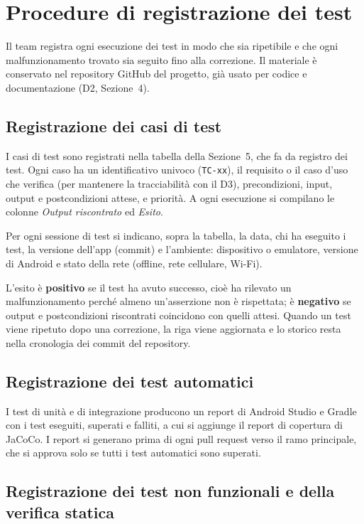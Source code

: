 \section{Procedure di registrazione dei test}

Il team registra ogni esecuzione dei test in modo che sia ripetibile e che ogni malfunzionamento trovato sia seguito fino alla correzione. Il materiale è conservato nel repository GitHub del progetto, già usato per codice e documentazione (D2, Sezione~4).

\subsection{Registrazione dei casi di test}

I casi di test sono registrati nella tabella della Sezione~5, che fa da registro dei test. Ogni caso ha un identificativo univoco (\texttt{TC-xx}), il requisito o il caso d'uso che verifica (per mantenere la tracciabilità con il D3), precondizioni, input, output e postcondizioni attese, e priorità. A ogni esecuzione si compilano le colonne \emph{Output riscontrato} ed \emph{Esito}.

Per ogni sessione di test si indicano, sopra la tabella, la data, chi ha eseguito i test, la versione dell'app (commit) e l'ambiente: dispositivo o emulatore, versione di Android e stato della rete (offline, rete cellulare, Wi-Fi).

L'esito è \textbf{positivo} se il test ha avuto successo, cioè ha rilevato un malfunzionamento perché almeno un'asserzione non è rispettata; è \textbf{negativo} se output e postcondizioni riscontrati coincidono con quelli attesi. Quando un test viene ripetuto dopo una correzione, la riga viene aggiornata e lo storico resta nella cronologia dei commit del repository.

\subsection{Registrazione dei test automatici}

I test di unità e di integrazione producono un report di Android Studio e Gradle con i test eseguiti, superati e falliti, a cui si aggiunge il report di copertura di JaCoCo. I report si generano prima di ogni pull request verso il ramo principale, che si approva solo se tutti i test automatici sono superati.

\subsection{Registrazione dei test non funzionali e della verifica statica}

